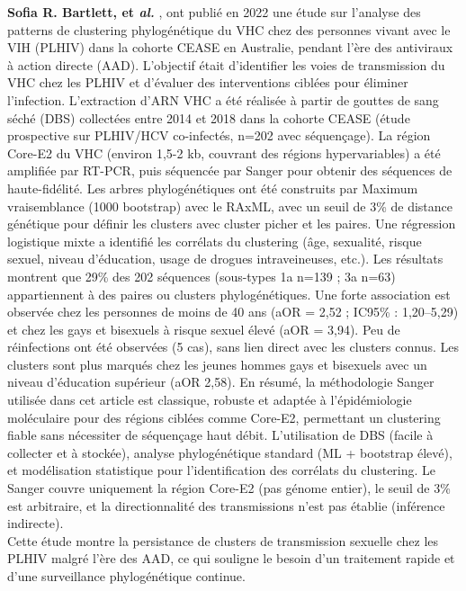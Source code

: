 \documentclass[a4paper,12pt]{article}
\begin{document}
\textbf {Sofia R. Bartlett, et \textit{al.} } \cite{bartlettPatternsCorrelatesHepatitis2022}, ont publié en 2022 une étude sur l’analyse des patterns de clustering phylogénétique du VHC chez des personnes vivant avec le VIH (PLHIV) dans la cohorte CEASE en Australie, pendant l’ère des antiviraux à action directe (AAD). L’objectif était d’identifier les voies de transmission du VHC chez les PLHIV et d’évaluer des interventions ciblées pour éliminer l’infection. L’extraction d’ARN VHC a été réalisée à partir de gouttes de sang séché (DBS) collectées entre 2014 et 2018 dans la cohorte CEASE (étude prospective sur PLHIV/HCV co-infectés, n=202 avec séquençage). La région Core-E2 du VHC (environ 1,5-2 kb, couvrant des régions hypervariables) a été amplifiée par RT-PCR, puis séquencée par Sanger pour obtenir des séquences de haute-fidélité. Les arbres phylogénétiques ont été construits par Maximum vraisemblance (1000 bootstrap) avec le RAxML, avec un seuil de 3\% de distance génétique pour définir les clusters avec cluster picher et les paires. Une régression logistique mixte a identifié les corrélats du clustering (âge, sexualité, risque sexuel, niveau d’éducation, usage de drogues intraveineuses, etc.). Les résultats montrent que 29\% des 202 séquences (sous-types 1a n=139 ; 3a n=63) appartiennent à des paires ou clusters phylogénétiques. Une forte association est observée chez les personnes de moins de 40 ans (aOR = 2,52 ; IC95\% : 1,20–5,29)  et chez les gays et bisexuels à risque sexuel élevé (aOR = 3,94). Peu de réinfections ont été observées (5 cas), sans lien direct avec les clusters connus. Les clusters sont plus marqués chez les jeunes hommes gays et bisexuels avec un niveau d’éducation supérieur (aOR 2,58). En résumé, la méthodologie Sanger utilisée dans cet article est classique, robuste et adaptée à l’épidémiologie moléculaire pour des régions ciblées comme Core-E2, permettant un clustering fiable sans nécessiter de séquençage haut débit. L’utilisation de DBS (facile à collecter et à stockée), analyse phylogénétique standard (ML + bootstrap élevé), et modélisation statistique pour l’identification des corrélats du clustering. Le Sanger couvre uniquement la région Core-E2 (pas génome entier), le seuil de 3\% est arbitraire, et la directionnalité des transmissions n’est pas établie (inférence indirecte).\\
Cette étude montre la persistance de clusters de transmission sexuelle chez les PLHIV malgré l’ère des AAD, ce qui souligne le besoin d’un traitement rapide et d’une surveillance phylogénétique continue.
\end{document}
